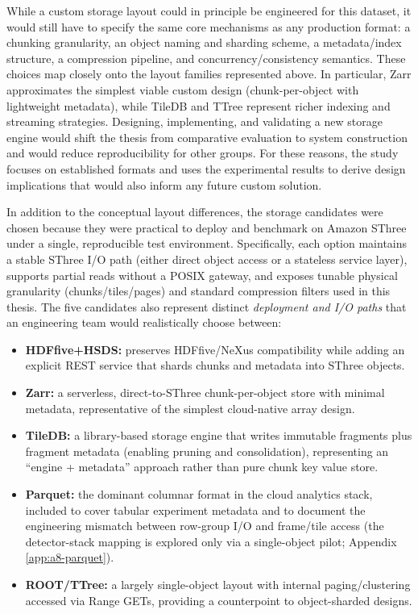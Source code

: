 \documentclass[nomenclature, english, bibtex]{kththesis}
\numberwithin{listing}{chapter}
\begin{document}
While a custom storage layout could in principle be engineered for this dataset, it would still have to specify the same core mechanisms as any production format: a chunking granularity, an object naming and sharding scheme, a metadata/index structure, a compression pipeline, and concurrency/consistency semantics. These choices map closely onto the layout families represented above. In particular, Zarr approximates the simplest viable custom design (chunk-per-object with lightweight metadata), while TileDB and \gls{TTree} represent richer indexing and streaming strategies. Designing, implementing, and validating a new storage engine would shift the thesis from comparative evaluation to system construction and would reduce reproducibility for other groups. For these reasons, the study focuses on established formats and uses the experimental results to derive design implications that would also inform any future custom solution.

In addition to the conceptual layout differences, the storage candidates were chosen because they were practical to deploy and benchmark on Amazon \gls{SThree} under a single, reproducible test environment. Specifically, each option maintains a stable \gls{SThree} I/O path (either direct object access or a stateless service layer), supports partial reads without a \gls{POSIX} gateway, and exposes tunable physical granularity (chunks/tiles/pages) and standard compression filters used in this thesis. The five candidates also represent distinct \emph{deployment and I/O paths} that an engineering team would realistically choose between:

  \begin{itemize}
	  \item \textbf{\gls{HDFfive}+\gls{HSDS}:} preserves \gls{HDFfive}/NeXus compatibility while adding an explicit REST service that shards chunks and metadata into \gls{SThree} objects.
	  \item \textbf{Zarr:} a serverless, direct-to-\gls{SThree} chunk-per-object store with minimal metadata, representative of the simplest cloud-native array design.
	  \item \textbf{TileDB:} a library-based storage engine that writes immutable fragments plus fragment metadata (enabling pruning and consolidation), representing an “engine + metadata” approach rather than pure chunk key value store.
	  \item \textbf{Parquet:} the dominant columnar format in the cloud analytics stack, included to cover tabular experiment metadata and to document the engineering mismatch between row-group I/O and frame/tile access (the detector-stack mapping is explored only via a single-object pilot; Appendix \ref{app:a8-parquet}).
	  \item \textbf{\gls{ROOT}/\gls{TTree}:} a largely single-object layout with internal paging/clustering accessed via Range GETs, providing a counterpoint to object-sharded designs.
  \end{itemize}
\end{document}
